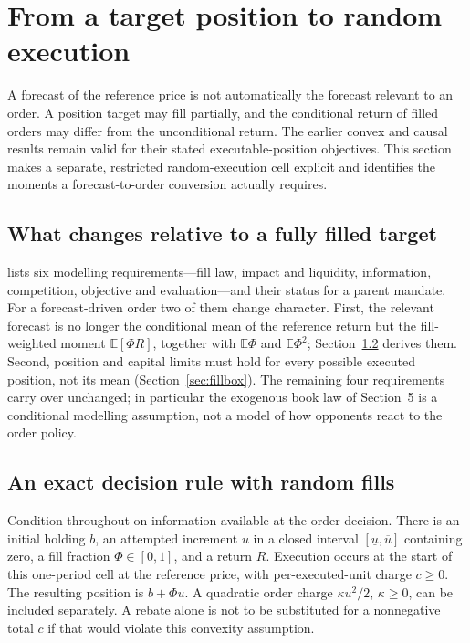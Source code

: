 \section{From a target position to random execution}
\label{sec:randomexecution}

A forecast of the reference price is not automatically the forecast
relevant to an order. A position target may fill partially, and the
conditional return of filled orders may differ from the unconditional
return. The earlier convex and causal results remain valid for their
stated executable-position objectives. This section makes a separate,
restricted random-execution cell explicit and identifies the moments a
forecast-to-order conversion actually requires.

\subsection{What changes relative to a fully filled target}
\citet[Section~37.1]{NoguerAlonso2026Execution} lists six modelling requirements---fill
law, impact and liquidity, information, competition, objective and
evaluation---and their status for a parent mandate. For a forecast-driven order
two of them change character. First, the relevant forecast is no longer the
conditional mean of the reference return but the fill-weighted moment
$\mathbb E[\Phi R]$, together with $\mathbb E\Phi$ and $\mathbb E\Phi^2$;
Section~\ref{sec:randomfill-rule} derives them. Second, position and capital
limits must hold for every possible executed position, not its mean
(Section~\ref{sec:fillbox}). The remaining four requirements carry over unchanged; in
particular the exogenous book law of Section~5 is a conditional modelling
assumption, not a model of how opponents react to the order policy.

\subsection{An exact decision rule with random fills}\label{sec:randomfill-rule}

Condition throughout on information available at the order decision.
There is an initial holding \(b\), an attempted increment \(u\) in a
closed interval \([\underline u,\overline u]\) containing zero, a fill
fraction \(\Phi\in[0,1]\), and a return \(R\). Execution occurs at the
start of this one-period cell at the reference price, with per-executed-unit
charge \(c\ge0\). The resulting position is \(b+\Phi u\).
A quadratic order charge \(\kappa u^2/2\), \(\kappa\ge0\), can be
included separately. A rebate alone is not to be substituted for a
nonnegative total \(c\) if that would violate this convexity assumption.

